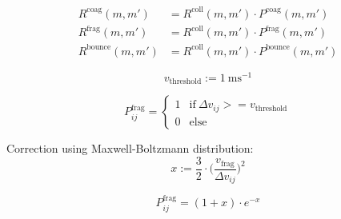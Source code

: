          \\
         \\

        \begin{align}
            R^\text{coag}(m,m')   &= R^\text{coll}(m,m') \cdot P^\text{coag}(m,m') \\
            R^\text{frag}(m,m')   &= R^\text{coll}(m,m') \cdot P^\text{frag}(m,m') \\
            R^\text{bounce}(m,m') &= R^\text{coll}(m,m') \cdot P^\text{bounce}(m,m')
        \end{align}

        \clearpage

        \begin{equation}
            v_\text{threshold}:=\SI{1}{\meter\second^{-1}}
        \end{equation}

        \begin{equation}
            P^\text{frag}_{ij}
            =
            \begin{cases}
                1 & \text{if}\ \Delta v_{ij} >= v_\text{threshold}\\
                0 & \text{else}
            \end{cases}
        \end{equation}
        
        Correction using Maxwell-Boltzmann distribution:
        \begin{equation}
            x:=\frac{3}{2}\cdot\bigg(
                \frac{v_\text{frag}}{\Delta v_{ij}}
            \bigg)^2
        \end{equation}
        
        \begin{equation}
            P^\text{frag}_{ij}=(1+x)\cdot e^{-x}
        \end{equation}

        



